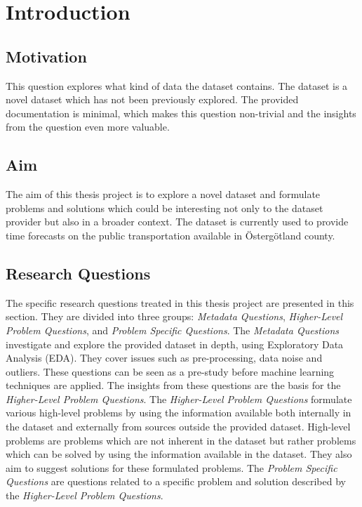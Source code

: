 \chapter{Introduction}
\label{cha:introduction}

\section{Motivation}
\label{sec:motivation}
This question explores what kind of data the dataset contains.
The dataset is a novel dataset which has not been previously explored.
The provided documentation is minimal, which makes this question non-trivial and the insights from the question even more valuable.

\section{Aim}
\label{sec:aim}
The aim of this thesis project is to explore a novel dataset and formulate problems and solutions which could be interesting not only to the dataset provider but also in a broader context.
The dataset is currently used to provide time forecasts on the public transportation available in Östergötland county.

\section{Research Questions}
\label{sec:research-questions}
The specific research questions treated in this thesis project are presented in this section.
They are divided into three groups: \textit{Metadata Questions}, \textit{Higher-Level Problem Questions}, and \textit{Problem Specific Questions}.
The \textit{Metadata Questions} investigate and explore the provided dataset in depth, using Exploratory Data Analysis (EDA).
They cover issues such as pre-processing, data noise and outliers.
These questions can be seen as a pre-study before machine learning techniques are applied.
The insights from these questions are the basis for the \textit{Higher-Level Problem Questions}.
The \textit{Higher-Level Problem Questions} formulate various high-level problems by using the information available both internally in the dataset and externally from sources outside the provided dataset.
High-level problems are problems which are not inherent in the dataset but rather problems which can be solved by using the information available in the dataset.
They also aim to suggest solutions for these formulated problems.
The \textit{Problem Specific Questions} are questions related to a specific problem and solution described by the \textit{Higher-Level Problem Questions}.

